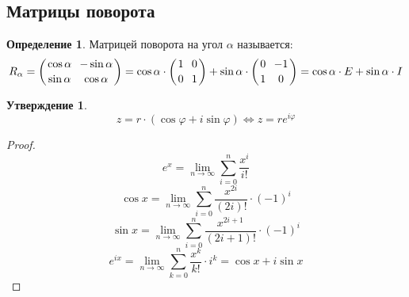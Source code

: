 \documentclass[12pt]{article}
\theoremstyle{definition}
\newtheorem{definition}{Определение}
\newtheorem{statement}[theorem]{Утверждение}
\begin{document}
    \subsection{Матрицы поворота}
    \begin{definition}
        Матрицей поворота на угол $\alpha$ называется:
        $$R_\alpha=\left({\cos \alpha \atop \sin \alpha}\,\,\, {-\sin \alpha \atop \cos \alpha}\right)=\cos \alpha \cdot \left({1 \atop 0}\,\,\, {0 \atop 1}\right)+\sin \alpha \cdot \left({0 \atop 1}\,\,\, {-1 \atop 0}\right)=\cos \alpha\cdot E+\sin\alpha\cdot I$$
    \end{definition}
    \begin{statement}
        $$z=r\cdot(\cos\varphi+ i\sin\varphi)\Longleftrightarrow z=re^{i\varphi}$$
    \end{statement}
    \begin{proof}
        $$e^x=\lim_{n\to\infty}\sum_{i=0}^n\dfrac{x^i}{i!}$$
        $$\cos x = \lim_{n\to\infty}\sum_{i=0}^n\dfrac{x^{2i}}{(2i)!}\cdot(-1)^i$$
        $$\sin x = \lim_{n\to\infty}\sum_{i=0}^n\dfrac{x^{2i+1}}{(2i+1)!}\cdot(-1)^i$$
        $$e^{ix}=\lim_{n\to\infty}\sum_{k=0}^n\dfrac{x^k}{k!}\cdot i^k=\cos x+ i\sin x$$
    \end{proof}
\end{document}
